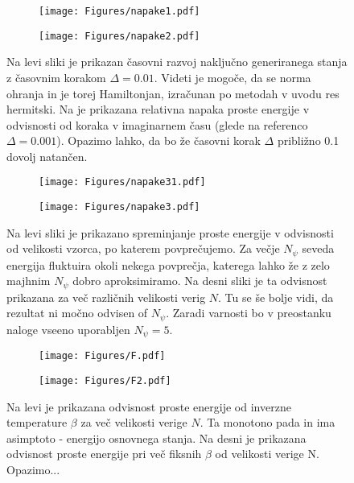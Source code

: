 \documentclass{article}
\begin{document}
\begin{figure}[H]
\centering
\begin{subfigure}{.49\textwidth}
\texttt{[image: Figures/napake1.pdf]}
\end{subfigure}
\begin{subfigure}{.49\textwidth}
\texttt{[image: Figures/napake2.pdf]}
\end{subfigure}
\caption*{Na levi sliki je prikazan časovni razvoj naključno generiranega stanja z časovnim korakom $\Delta = 0.01$. Videti je mogoče, da se norma ohranja in je torej Hamiltonjan, izračunan po metodah v uvodu res hermitski. Na je prikazana relativna napaka proste energije v odvisnosti od koraka v imaginarnem času (glede na referenco $\Delta = 0.001$). Opazimo lahko, da bo že časovni korak $\Delta$ približno 0.1 dovolj natančen.}
\end{figure}

\begin{figure}[H]
\centering
\begin{subfigure}{.49\textwidth}
\texttt{[image: Figures/napake31.pdf]}
\end{subfigure}
\begin{subfigure}{.49\textwidth}
\texttt{[image: Figures/napake3.pdf]}
\end{subfigure}
\caption*{Na levi sliki je prikazano spreminjanje proste energije v odvisnosti od velikosti vzorca, po katerem povprečujemo. Za večje $N_\psi$ seveda energija fluktuira okoli nekega povprečja, katerega lahko že z zelo majhnim $N_\psi$ dobro aproksimiramo. Na desni sliki je ta odvisnost prikazana za več različnih velikosti verig $N$. Tu se še bolje vidi, da rezultat ni močno odvisen of $N_\psi$. Zaradi varnosti bo v preostanku naloge vseeno uporabljen $N_\psi=5$.}
\end{figure}


\begin{figure}[H]
\centering
\begin{subfigure}{.49\textwidth}
\texttt{[image: Figures/F.pdf]}
\end{subfigure}
\begin{subfigure}{.49\textwidth}
\texttt{[image: Figures/F2.pdf]}
\end{subfigure}
\caption*{Na levi je prikazana odvisnost proste energije od inverzne temperature $\beta$ za več velikosti verige $N$. Ta monotono pada in ima asimptoto - energijo osnovnega stanja. Na desni je prikazana odvisnost proste energije pri več fiksnih $\beta$ od velikosti verige N. Opazimo...}
\end{figure}
\end{document}
